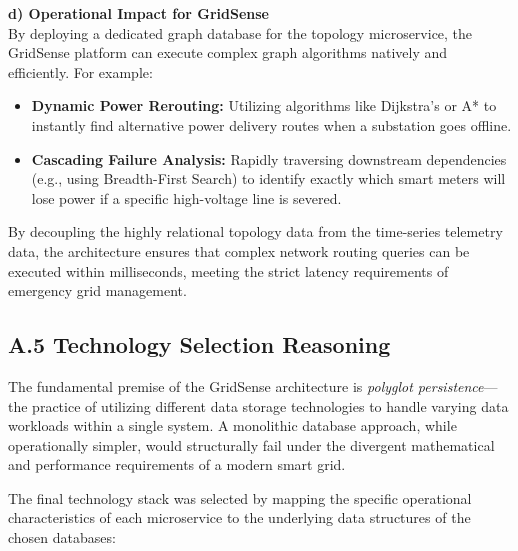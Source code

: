 \documentclass[11pt, a4paper]{article}
\makeatletter
\renewcommand{\_}{\origunderscore\penalty\z@\hskip\z@skip}
\renewcommand{\{}{\origlbrace\penalty\z@\hskip\z@skip}
\renewcommand{\}}{\origrbrace\penalty\z@\hskip\z@skip}
\makeatother
\begin{document}
\textbf{d) Operational Impact for GridSense} \\
By deploying a dedicated graph database for the topology microservice, the GridSense platform can execute complex graph algorithms natively and efficiently. For example:
\begin{itemize}
    \item \textbf{Dynamic Power Rerouting:} Utilizing algorithms like Dijkstra's or A* to instantly find alternative power delivery routes when a substation goes offline.
    \item \textbf{Cascading Failure Analysis:} Rapidly traversing downstream dependencies (e.g., using Breadth-First Search) to identify exactly which smart meters will lose power if a specific high-voltage line is severed.
\end{itemize}
By decoupling the highly relational topology data from the time-series telemetry data, the architecture ensures that complex network routing queries can be executed within milliseconds, meeting the strict latency requirements of emergency grid management.

\subsection*{A.5 Technology Selection Reasoning}

The fundamental premise of the GridSense architecture is \textit{polyglot persistence}---the practice of utilizing different data storage technologies to handle varying data workloads within a single system. A monolithic database approach, while operationally simpler, would structurally fail under the divergent mathematical and performance requirements of a modern smart grid.

The final technology stack was selected by mapping the specific operational characteristics of each microservice to the underlying data structures of the chosen databases:
\end{document}
